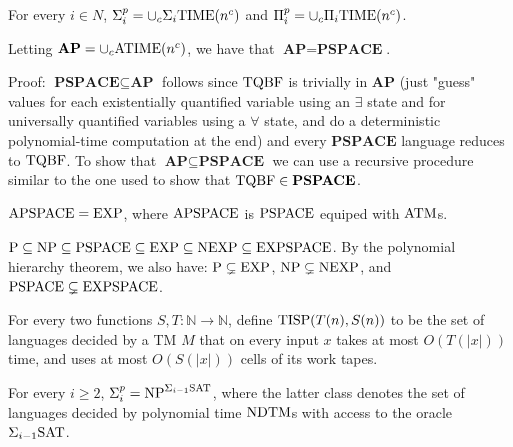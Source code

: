 \begin{note}
For every $i \in N$, $\Sigma_{i}^{p} = \cup_{c}\Sigma_{i}\mathrm{TIME}(n^c)$ and
$\Pi_{i}^{p} = \cup_{c} \Pi_{i} \mathrm{TIME}(n^c)$.
\end{note}

\begin{note}
Letting $\textbf{AP} = \cup_{c} \mathrm{ATIME}(n^c)$, we have
that $\textbf{AP} = \textbf{PSPACE}$.

Proof: $\textbf{PSPACE} \subseteq \textbf{AP}$ follows since $\mathrm{TQBF}$ is
trivially in $\textbf{AP}$ (just "guess" values for each existentially
quantified variable using an $\exists$ state and for universally quantified
variables using a $\forall$ state, and do a deterministic polynomial-time
computation at the end) and every $\textbf{PSPACE}$ language reduces
to $\mathrm{TQBF}$. To show that $\textbf{AP} \subseteq \textbf{PSPACE}$ we can use a
recursive procedure similar to the one used to show
that $\mathrm{TQBF} \in \textbf{PSPACE}$. 
\end{note}

\begin{note}
  $\mathrm{APSPACE} = \mathrm{EXP}$, where $\mathrm{APSPACE}$ is $\mathrm{PSPACE}$ equiped with $\mathrm{ATM}$s.
\end{note}

\begin{note}
  $\mathrm{P} \subseteq \mathrm{NP} \subseteq \mathrm{PSPACE} \subseteq \mathrm{EXP} \subseteq \mathrm{NEXP}
  \subseteq \mathrm{EXPSPACE}$.
  By the polynomial hierarchy theorem, we also have:
  $\mathrm{P} \subsetneq \mathrm{EXP}$, $\mathrm{NP} \subsetneq \mathrm{NEXP}$, and
  $\mathrm{PSPACE} \subsetneq \mathrm{EXPSPACE}$.
\end{note}

\begin{note}
  For every two functions $S, T : \mathbb{N} \to \mathbb{N}$, define
  $\mathrm{TISP}(T(n), S(n))$ to be the set of languages decided by a TM $M$ that on
  every input $x$ takes at most $O(T(|x|))$ time, and uses at most
  $O(S(|x|))$ cells of its work tapes.
\end{note}

\begin{note}
  For every $i \geq 2$, $\Sigma_i ^p = \mathrm{NP}^{\Sigma_{i - 1} \mathrm{SAT}}$, where the
  latter class denotes the set of languages decided by polynomial time
  $\mathrm{NDTM}$s with access to the oracle $\Sigma_{i - 1} \mathrm{SAT}$.
\end{note}


